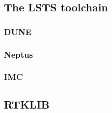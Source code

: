 \subsection{The LSTS toolchain}

    \subsubsection{DUNE}
    
    \subsubsection{Neptus}
        
    \subsubsection{IMC}

\subsection{RTKLIB}